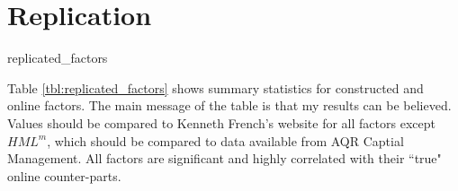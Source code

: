 
\section*{Replication}

{replicated_factors}

Table \ref{tbl:replicated_factors} shows summary statistics for constructed and
online factors.
The main message of the table is that my results can be believed.
Values should be compared to Kenneth French's website for all factors except
$HML^m$, which should be compared to data available from AQR Captial Management.
All factors are significant and highly correlated with their ``true" online counter-parts.
